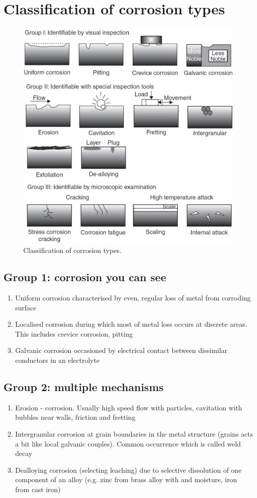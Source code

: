\section{Classification of corrosion types}
\begin{figure}[H]
    \centering
    \includegraphics[width = \textwidth]{img/figure73.png}
    \caption{Classification of corrosion types.}
\end{figure}
\subsection{Group 1: corrosion you can see}
\begin{enumerate}
    \item Uniform corrosion characterised by even, regular loss of metal from corroding surface
    \item Localised corrosion during which most of metal loss occurs at discrete areas. This includes crevice corrosion, pitting
    \item Galvanic corrosion occasioned by electrical contact between dissimilar conductors in an electrolyte
\end{enumerate}
\subsection{Group 2: multiple mechanisms}
\begin{enumerate}
    \item Erosion - corrosion. Usually high speed flow with particles, cavitation with bubbles near walls, friction and fretting
    \item Intergranular corrosion at grain boundaries in the metal structure (grains acts a bit like local galvanic couples). Common occurrence which is called weld decay
    \item Dealloying corrosion (selecting leaching) due to selective dissolution of one component of an alloy (e.g. zinc from brass alloy with  and moisture, iron from cast iron)
\end{enumerate}
